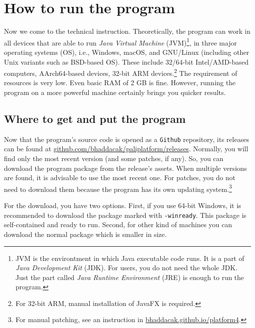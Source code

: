 \section{How to run the program}

Now we come to the technical instruction. Theoretically, the program can work in all devices that are able to run \emph{Java Virtual Machine} (JVM)\footnote{JVM is the environtment in which Java executable code runs. It is a part of \emph{Java Development Kit} (JDK). For users, you do not need the whole JDK. Just the part called \emph{Java Runtime Environment} (JRE) is enough to run the program.}, in three major operating systems (OS), i.e., Windows, macOS, and GNU/Linux (including other Unix variants such as BSD-based OS). These include 32/64-bit Intel/AMD-based computers, AArch64-based devices, 32-bit ARM devices.\footnote{For 32-bit ARM, manual installation of JavaFX is required.} The requirement of resources is very low. Even basic RAM of 2 GB is fine. However, running the program on a more powerful machine certainly brings you quicker results.

\subsection{Where to get and put the program}

Now that the program's source code is opened as a \texttt{Github} repository, its releases can be found at \url{github.com/bhaddacak/paliplatform/releases}. Normally, you will find only the most recent version (and some patches, if any). So, you can download the program package from the release's assets. When multiple versions are found, it is advisable to use the most recent one. For patches, you do not need to download them because the program has its own updating system.\footnote{For manual patching, see an instruction in \url{bhaddacak.github.io/platform4}.}

\newpage
{}

For the download, you have two options. First, if you use 64-bit Windows, it is recommended to download the package marked with \texttt{-winready}. This package is self-contained and ready to run. Second, for other kind of machines you can download the normal package which is smaller in size.

